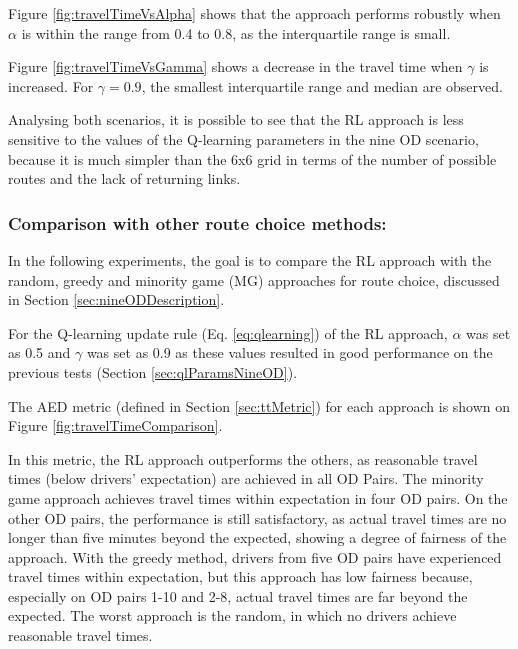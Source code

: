 \documentclass{RITA}
\begin{document}
Figure \ref{fig:travelTimeVsAlpha} shows that the approach performs robustly when $\alpha$ is within the range from 0.4 to 0.8, as the interquartile range is small.%

Figure \ref{fig:travelTimeVsGamma} shows a decrease in the travel time when $\gamma$ is increased. For $\gamma = 0.9$, the smallest interquartile range and median are observed.

Analysing both scenarios, it is possible to see that the RL approach is less sensitive to the values of the Q-learning parameters in the nine OD scenario, because it is much simpler than the 6x6 grid in terms of the number of possible routes and the lack of returning links. 

\subsubsection{Comparison with other route choice methods:}
\label{sec:comparison}
In the following experiments, the goal is to compare the RL approach with the random, greedy and minority game (MG) approaches for route choice, discussed in Section \ref{sec:nineODDescription}.

For the Q-learning update rule (Eq. \ref{eq:qlearning}) of the RL approach, $\alpha$ was set as 0.5 and $\gamma $ was set as 0.9 as these values resulted in good performance on the previous tests (Section \ref{sec:qlParamsNineOD}).

The AED metric (defined in Section \ref{sec:ttMetric}) for each approach is shown on Figure \ref{fig:travelTimeComparison}. 

In this metric, the RL approach outperforms the others, as reasonable travel times (below drivers' expectation) are achieved in all OD Pairs. The minority game approach achieves travel times within expectation in four OD pairs. On the other OD pairs, the performance is still satisfactory, as actual travel times are no longer than five minutes beyond the expected, showing a degree of fairness of the approach. With the greedy method, drivers from five OD pairs have experienced travel times within expectation, but this approach has low fairness because, especially on OD pairs 1-10 and 2-8, actual travel times are far beyond the expected. The worst approach is the random, in which no drivers achieve reasonable travel times.
\end{document}
